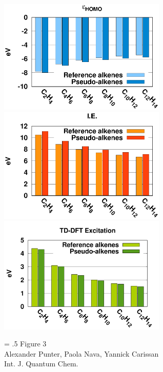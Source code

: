 \documentclass[12pt]{article}
\begin{document}
\begin{figure}
\begin{center}
\includegraphics[width=8cm]{short_pbe0_homo_uhf}\\
\includegraphics[width=8cm]{short_pbe0_ie_uhf}\\
\includegraphics[width=8cm]{short_pbe0_tddft}
\end{center}
{\Large
\begin{minipage}[t]{3in}
\baselineskip = .5\baselineskip
Figure 3 \\
Alexander Punter, Paola Nava, Yannick Carissan\\
Int. J. Quantum Chem.
\end{minipage}
}
\end{figure}

\clearpage
\end{document}
